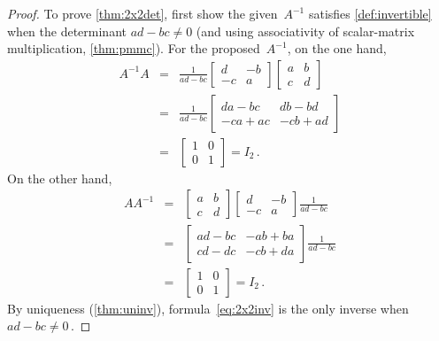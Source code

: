 \begin{proof} 
To prove \cref{thm:2x2det}, first show the given~\(A^{-1}\) satisfies \cref{def:invertible} when the determinant \(ad-bc\neq 0\) (and using associativity of scalar-matrix multiplication, \cref{thm:pmmc}).
For the proposed~\(A^{-1}\), on the one hand,
\begin{eqnarray*}
A^{-1}A&=&\frac1{ad-bc}\begin{bmatrix} d&-b\\-c&a \end{bmatrix}
\begin{bmatrix} a&b\\c&d \end{bmatrix}
\\&=&\frac1{ad-bc}\begin{bmatrix} da-bc&db-bd\\-ca+ac&-cb+ad \end{bmatrix}
\\&=&\begin{bmatrix} 1&0\\0&1 \end{bmatrix}=I_2\,.
\end{eqnarray*}
On the other hand,
\begin{eqnarray*}
AA^{-1}&=&
\begin{bmatrix} a&b\\c&d \end{bmatrix}\begin{bmatrix} d&-b\\-c&a \end{bmatrix}\frac1{ad-bc}
\\&=&\begin{bmatrix} ad-bc&-ab+ba\\cd-dc&-cb+da \end{bmatrix}\frac1{ad-bc}
\\&=&\begin{bmatrix} 1&0\\0&1 \end{bmatrix}=I_2\,.
\end{eqnarray*}
By uniqueness (\cref{thm:uninv}), formula~\eqref{eq:2x2inv} is the only inverse when \(ad-bc\neq 0\)\,.


\end{proof}
